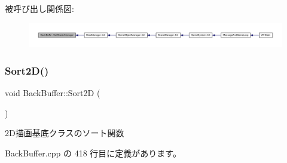 被呼び出し関係図\+:
\nopagebreak
\begin{figure}[H]
\begin{center}
\leavevmode
\includegraphics[width=350pt]{class_back_buffer_a44566449a4df988cb1cfe5ffbb0455cc_icgraph}
\end{center}
\end{figure}
\mbox{\label{class_back_buffer_a1530979126918a1a76b6555a5d9de9b8}} 
\subsubsection{\texorpdfstring{Sort2\+D()}{Sort2D()}}
{\footnotesize\ttfamily void Back\+Buffer\+::\+Sort2D (\begin{DoxyParamCaption}{ }\end{DoxyParamCaption})\hspace{0.3cm}{\ttfamily [private]}}



2\+D描画基底クラスのソート関数 



 Back\+Buffer.\+cpp の 418 行目に定義があります。

